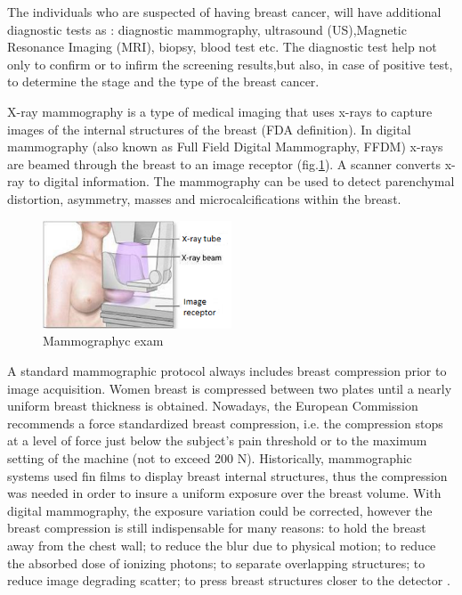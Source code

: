 The individuals who are suspected of having breast cancer, will have additional diagnostic tests as : diagnostic mammography, ultrasound (US),Magnetic Resonance Imaging (MRI), biopsy, blood test etc. The diagnostic test help not only to confirm or to infirm the screening results,but also, in case of positive test,  to determine the stage and the type of the breast cancer.
\label{section:medicalimaging}

X-ray mammography is a type of medical imaging that uses x-rays to capture images of the internal structures of the breast (FDA  definition). In digital mammography (also known as Full Field Digital Mammography, FFDM) x-rays are beamed through the breast to an image receptor (fig.\ref{fig:mammographyc ecam}). A scanner converts x-ray to digital information. The mammography can be used to detect parenchymal distortion, asymmetry, masses and microcalcifications within the breast. 

	
\begin{figure}[!h]
\centering
\includegraphics[width=0.5\textwidth,keepaspectratio]{figures/xraymammo.PNG} 
\caption[Mammographyc exam]{Mammographyc exam}
\label{fig:mammographyc ecam}
\end{figure} 

A standard mammographic protocol always includes breast compression prior to image acquisition. Women breast is compressed between two plates until a nearly uniform breast thickness is obtained. Nowadays, the European Commission recommends a force standardized breast compression, i.e. the compression stops at a level of force just below the subject’s pain threshold or to the maximum setting of the machine (not to exceed 200 N). Historically,  mammographic systems used fin films to display breast internal structures, thus the compression was needed in order to insure a uniform exposure over the breast volume. With digital mammography, the exposure variation could be corrected, however the breast compression is still indispensable for many reasons: to hold the breast away from the chest wall; to reduce the blur due to physical motion; to reduce the absorbed dose of ionizing photons; to separate overlapping structures; to reduce image degrading scatter; to press breast structures closer to the detector \citep{kopans2007breast}.

